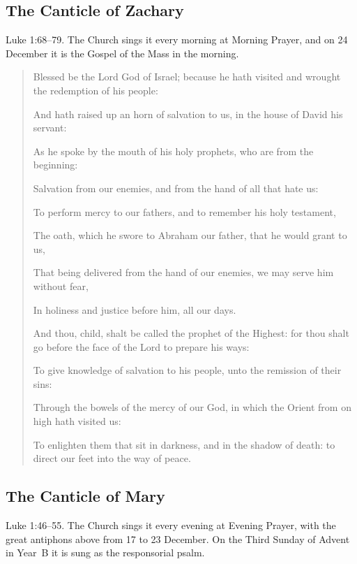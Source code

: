 \subsection{The Canticle of Zachary}

Luke 1:68--79. The Church sings it every morning at Morning Prayer, and on
24 December it is the Gospel of the Mass in the morning.

\begin{quote}
Blessed be the Lord God of Israel; because he hath visited and wrought the redemption of his people:\par
And hath raised up an horn of salvation to us, in the house of David his servant:\par
As he spoke by the mouth of his holy prophets, who are from the beginning:\par
Salvation from our enemies, and from the hand of all that hate us:\par
To perform mercy to our fathers, and to remember his holy testament,\par
The oath, which he swore to Abraham our father, that he would grant to us,\par
That being delivered from the hand of our enemies, we may serve him without fear,\par
In holiness and justice before him, all our days.\par
And thou, child, shalt be called the prophet of the Highest: for thou shalt go before the face of the Lord to prepare his ways:\par
To give knowledge of salvation to his people, unto the remission of their sins:\par
Through the bowels of the mercy of our God, in which the Orient from on high hath visited us:\par
To enlighten them that sit in darkness, and in the shadow of death: to direct our feet into the way of peace.\par
\end{quote}

\subsection{The Canticle of Mary}

Luke 1:46--55. The Church sings it every evening at Evening Prayer, with the
great antiphons above from 17 to 23 December. On the Third Sunday of Advent in
Year~B it is sung as the responsorial psalm.


